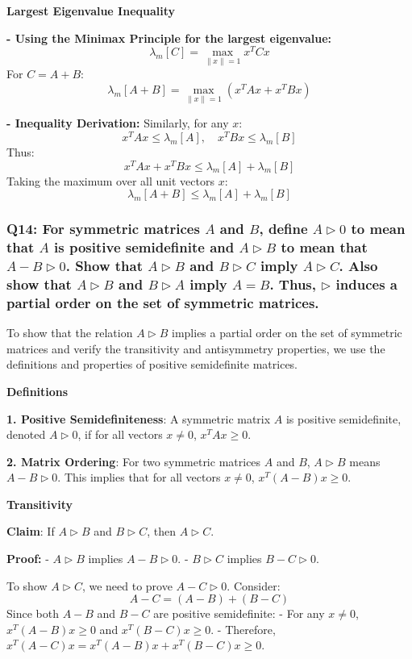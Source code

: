 \documentclass[8pt]{article}
\begin{document}
\textbf{Largest Eigenvalue Inequality}

\textbf{- Using the Minimax Principle for the largest eigenvalue:}
   \[
   \lambda_m[C] = \max_{\|x\| = 1} x^T C x
   \]
   For \(C = A + B\):
   \[
   \lambda_m[A+B] = \max_{\|x\| = 1} (x^T A x + x^T B x)
   \]

\textbf{- Inequality Derivation:}
   Similarly, for any \(x\):
   \[
   x^T A x \leq \lambda_m[A], \quad x^T B x \leq \lambda_m[B]
   \]
   Thus:
   \[
   x^T A x + x^T B x \leq \lambda_m[A] + \lambda_m[B]
   \]
   Taking the maximum over all unit vectors \(x\):
   \[
   \lambda_m[A + B] \leq \lambda_m[A] + \lambda_m[B]
   \]


\subsubsection*{Q14: For symmetric matrices \(A\) and \(B\), define \(A \triangleright 0\) to mean that \(A\) is positive semidefinite and \(A \triangleright B\) to mean that \(A - B \triangleright 0\). Show that \(A \triangleright B\) and \(B \triangleright C\) imply \(A \triangleright C\). Also show that \(A \triangleright B\) and \(B \triangleright A\) imply \(A = B\). Thus, \(\triangleright\) induces a partial order on the set of symmetric matrices.}

To show that the relation \(A \triangleright B\) implies a partial order on the set of symmetric matrices and verify the transitivity and antisymmetry properties, we use the definitions and properties of positive semidefinite matrices.

\textbf{Definitions}

\textbf{1. Positive Semidefiniteness}:
   A symmetric matrix \(A\) is positive semidefinite, denoted \(A \triangleright 0\), if for all vectors \(x \neq 0\), \(x^T A x \geq 0\).

\textbf{2. Matrix Ordering}:
   For two symmetric matrices \(A\) and \(B\), \(A \triangleright B\) means \(A - B \triangleright 0\). This implies that for all vectors \(x \neq 0\), \(x^T (A - B) x \geq 0\).

\textbf{Transitivity}

\textbf{Claim}: If \(A \triangleright B\) and \(B \triangleright C\), then \(A \triangleright C\).

\textbf{Proof:}
- \(A \triangleright B\) implies \(A - B \triangleright 0\).
- \(B \triangleright C\) implies \(B - C \triangleright 0\).
  
To show \(A \triangleright C\), we need to prove \(A - C \triangleright 0\). Consider:
\[
A - C = (A - B) + (B - C)
\]
Since both \(A - B\) and \(B - C\) are positive semidefinite:
- For any \(x \neq 0\), \(x^T (A - B) x \geq 0\) and \(x^T (B - C) x \geq 0\).
- Therefore, \(x^T (A - C) x = x^T (A - B) x + x^T (B - C) x \geq 0\).
\end{document}
